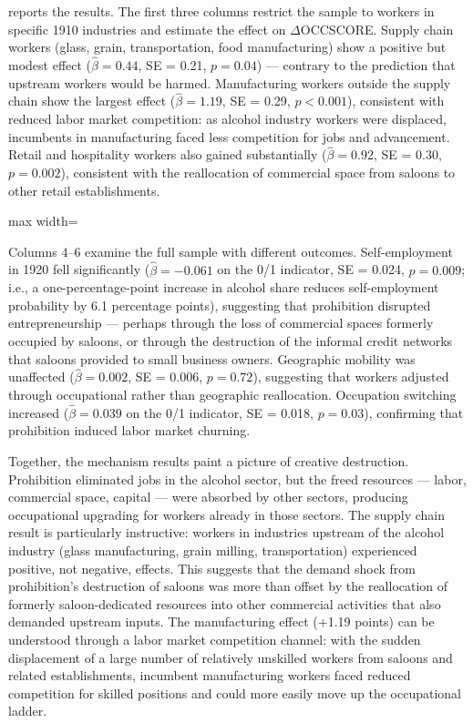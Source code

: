 \documentclass[12pt]{article}
\begin{document}
 reports the results. The first three columns restrict the sample to workers in specific 1910 industries and estimate the effect on $\Delta$OCCSCORE. Supply chain workers (glass, grain, transportation, food manufacturing) show a positive but modest effect ($\hat{\beta} = 0.44$, SE = 0.21, $p = 0.04$) --- contrary to the prediction that upstream workers would be harmed. Manufacturing workers outside the supply chain show the largest effect ($\hat{\beta} = 1.19$, SE = 0.29, $p < 0.001$), consistent with reduced labor market competition: as alcohol industry workers were displaced, incumbents in manufacturing faced less competition for jobs and advancement. Retail and hospitality workers also gained substantially ($\hat{\beta} = 0.92$, SE = 0.30, $p = 0.002$), consistent with the reallocation of commercial space from saloons to other retail establishments.

\begin{table}[H]
\centering
\caption{Mechanism Tests by Pre-Prohibition Industry and Outcome}
\label{tab:mechanisms}
\begin{adjustbox}{max width=\textwidth}

\end{adjustbox}
\end{table}

Columns 4--6 examine the full sample with different outcomes. Self-employment in 1920 fell significantly ($\hat{\beta} = -0.061$ on the 0/1 indicator, SE = 0.024, $p = 0.009$; i.e., a one-percentage-point increase in alcohol share reduces self-employment probability by 6.1 percentage points), suggesting that prohibition disrupted entrepreneurship --- perhaps through the loss of commercial spaces formerly occupied by saloons, or through the destruction of the informal credit networks that saloons provided to small business owners. Geographic mobility was unaffected ($\hat{\beta} = 0.002$, SE = 0.006, $p = 0.72$), suggesting that workers adjusted through occupational rather than geographic reallocation. Occupation switching increased ($\hat{\beta} = 0.039$ on the 0/1 indicator, SE = 0.018, $p = 0.03$), confirming that prohibition induced labor market churning.

Together, the mechanism results paint a picture of creative destruction. Prohibition eliminated jobs in the alcohol sector, but the freed resources --- labor, commercial space, capital --- were absorbed by other sectors, producing occupational upgrading for workers already in those sectors. The supply chain result is particularly instructive: workers in industries upstream of the alcohol industry (glass manufacturing, grain milling, transportation) experienced positive, not negative, effects. This suggests that the demand shock from prohibition's destruction of saloons was more than offset by the reallocation of formerly saloon-dedicated resources into other commercial activities that also demanded upstream inputs. The manufacturing effect (+1.19 points) can be understood through a labor market competition channel: with the sudden displacement of a large number of relatively unskilled workers from saloons and related establishments, incumbent manufacturing workers faced reduced competition for skilled positions and could more easily move up the occupational ladder.
\end{document}
